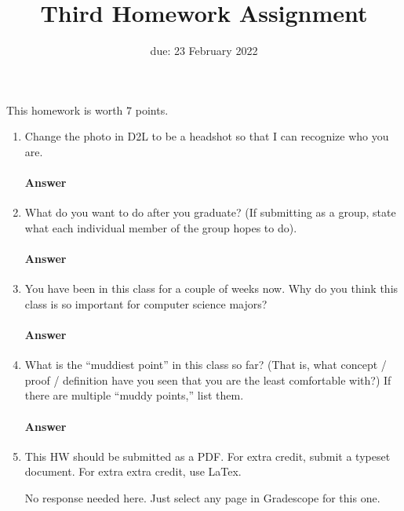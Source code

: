 \renewcommand{\hwnum}{3}

\title{Third Homework Assignment}
\date{due: 23 February 2022}
\maketitle

This homework is worth $7$ points.



\begin{enumerate}

    \item Change the photo in D2L to be a headshot so that I can recognize who you are.
        \paragraph{Answer}

    \item What do you want to do after you graduate? (If submitting as a group,
        state what each individual member of the group hopes to do).
        \paragraph{Answer}
        \todo{}

    \item You have been in this class for a couple of weeks now.  Why do you
        think this class is so important for computer science majors?
        \paragraph{Answer}
        \todo{}

    \item What is the ``muddiest point'' in this class so far?  (That is, what
        concept / proof / definition have you seen that you are the least
        comfortable with?)  If there are multiple ``muddy points,'' list them.
        \paragraph{Answer}
        \todo{}

    \item This HW should be submitted as a PDF.
        For extra credit, submit a typeset document. For extra extra credit,
        use LaTex.

        No response needed here. Just select any page in Gradescope
        for this one.

\end{enumerate}

